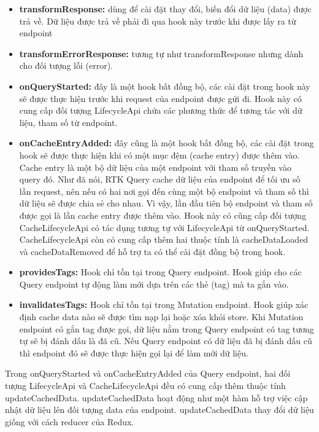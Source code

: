 \begin{itemize}
  \item \textbf{transformResponse:} dùng để cài đặt thay đổi, biến đổi dữ liệu (data) được trả về.
        Dữ liệu được trả về phải đi qua hook này trước khi được lấy ra từ endpoint
  \item \textbf{transformErrorResponse:} tương tự như transformResponse nhưng dành cho đối tượng lỗi (error).
  \item \textbf{onQueryStarted:} đây là một hook bất đồng bộ, các cài đặt trong hook này sẽ được thực hiện trước khi request của endpoint được gửi đi. Hook này có cung cấp đối tượng LifecycleApi chứa các phương thức để tương tác với dữ liệu, tham số từ endpoint.
  \item \textbf{onCacheEntryAdded:} đây cũng là một hook bất đồng bộ, các cài đặt trong hook sẽ được thực hiện khi có một mục đệm (cache entry) được thêm vào.
        Cache entry là một bộ dữ liệu của một endpoint với tham số truyền vào query đó.
        Như đã nói, RTK Query cache dữ liệu của endpoint để tối ưu số lần request, nên nếu có hai nơi gọi đến cùng một bộ endpoint và tham số thì dữ liệu sẽ được chia sẻ cho nhau.
        Vì vậy, lần đầu tiên bộ endpoint và tham số được gọi là lần cache entry được thêm vào.
        Hook này có cũng cấp đối tượng CacheLifecycleApi có tác dụng tương tự với LifecycleApi từ onQueryStarted.
        CacheLifecycleApi còn có cung cấp thêm hai thuộc tính là cacheDataLoaded và cacheDataRemoved để hỗ trợ ta có thể cài đặt đồng bộ trong hook.
  \item \textbf{providesTags:} Hook chỉ tồn tại trong Query endpoint.
        Hook giúp cho các Query endpoint tự động làm mới dựa trên các thẻ (tag) mà ta gắn vào.
  \item \textbf{invalidatesTags:} Hook chỉ tồn tại trong Mutation endpoint.
        Hook giúp xác định cache data nào sẽ được tìm nạp lại hoặc xóa khỏi store.
        Khi Mutation endpoint có gắn tag được gọi, dữ liệu nằm trong Query endpoint có tag tương tự sẽ bị đánh dấu là đã cũ.
        Nếu Query endpoint có dữ liệu đã bị đánh dấu cũ thì endpoint đó sẽ được thực hiện gọi lại để làm mới dữ liệu.
\end{itemize}

Trong onQueryStarted và onCacheEntryAdded của Query endpoint, hai đối tượng LifecycleApi và CacheLifecycleApi đều có cung cấp thêm thuộc tính updateCachedData.
updateCachedData hoạt động như một hàm hỗ trợ việc cập nhật dữ liệu lên đối tượng data của endpoint.
updateCachedData thay đổi dữ liệu giống với cách reducer của Redux.
\par

